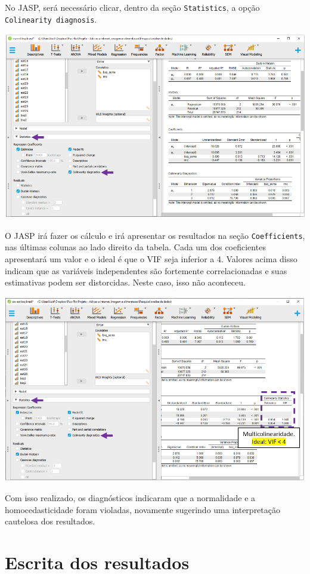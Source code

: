 \documentclass[
]{book}
\begin{document}
No JASP, será necessário clicar, dentro da seção \texttt{Statistics}, a opção \texttt{Colinearity\ diagnosis}.

\includegraphics{./img/cap_reg_multipla_colinearidade_jasp.png}

O JASP irá fazer os cálculo e irá apresentar os resultados na seção \texttt{Coefficients}, nas últimas colunas ao lado direito da tabela. Cada um dos coeficientes apresentará um valor e o ideal é que o VIF seja inferior a 4. Valores acima disso indicam que as variáveis independentes são fortemente correlacionadas e suas estimativas podem ser distorcidas. Neste caso, isso não aconteceu.

\includegraphics{./img/cap_reg_multipla_colinearidade2_jasp.png}

Com isso realizado, os diagnósticos indicaram que a normalidade e a homocedasticidade foram violadas, novamente sugerindo uma interpretação cautelosa dos resultados.

\hypertarget{escrita-dos-resultados-14}{%
\section{Escrita dos resultados}\label{escrita-dos-resultados-14}}
\end{document}
